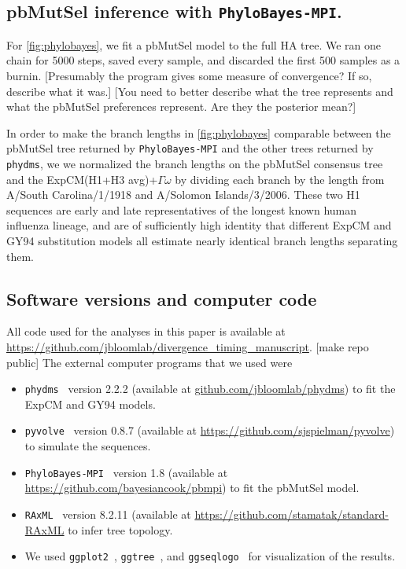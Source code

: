 \documentclass[11pt]{article}
\newcommand\skhcomment[1]{{\color{cyan}[#1]}}
\newcommand\jdbcomment[1]{{\color{red}[#1]}}
\begin{document}
\subsection*{pbMutSel inference with \texttt{PhyloBayes-MPI}.}
For \ref{fig:phylobayes}, we fit a pbMutSel model to the full HA tree. 
We ran one chain for 5000 steps, saved every sample, and discarded the first 500 samples as a burnin. 
\jdbcomment{Presumably the program gives some measure of convergence? If so, describe what it was.}
\jdbcomment{You need to better describe what the tree represents and what the pbMutSel preferences represent. Are they the posterior mean?}

In order to make the branch lengths in \ref{fig:phylobayes} comparable between the pbMutSel tree returned by \texttt{PhyloBayes-MPI} and the other trees returned by \texttt{phydms}, we we normalized the branch lengths on the pbMutSel consensus tree and the ExpCM(H1+H3 avg)+$\Gamma\omega$ by dividing each branch by the length from A/South Carolina/1/1918 and A/Solomon Islands/3/2006. 
These two H1 sequences are early and late representatives of the longest known human influenza lineage, and are of sufficiently high identity that different ExpCM and GY94 substitution models all estimate nearly identical branch lengths separating them. 

\subsection*{Software versions and computer code}
All code used for the analyses in this paper is available at \url{https://github.com/jbloomlab/divergence_timing_manuscript}. \skhcomment{make repo public}
The external computer programs that we used were
\begin{itemize} 
\item \texttt{phydms}~\citep{hilton2017phydms} version 2.2.2 (available at \url{github.com/jbloomlab/phydms}) to fit the ExpCM and GY94 models.
\item \texttt{pyvolve}~\citep{spielman2015pyvolve} version 0.8.7 (available at \url{https://github.com/sjspielman/pyvolve}) to simulate the sequences.
\item \texttt{PhyloBayes-MPI}~\citep{rodrigue2014site} version 1.8 (available at \url{https://github.com/bayesiancook/pbmpi}) to fit the pbMutSel model. 
\item \texttt{RAxML}~\citep{stamatakis2006raxml} version 8.2.11 (available at \url{https://github.com/stamatak/standard-RAxML} to infer tree topology.
\item We used \texttt{ggplot2}~\citep{wickham2016ggplot2}, \texttt{ggtree}~\citep{yu2017ggtree}, and \texttt{ggseqlogo}~\citep{wagih2017ggseqlogo} for visualization of the results.
\end{itemize}
\end{document}
